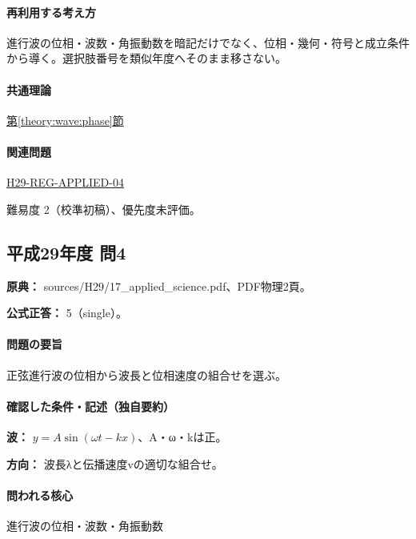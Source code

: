 \paragraph{再利用する考え方} 進行波の位相・波数・角振動数を暗記だけでなく、位相・幾何・符号と成立条件から導く。選択肢番号を類似年度へそのまま移さない。

\paragraph{共通理論} \hyperref[theory:wave:phase]{第\ref*{theory:wave:phase}節}

\paragraph{関連問題} \hyperref[q:h29-reg-applied-04]{H29-REG-APPLIED-04}

\par 難易度 2（校準初稿）、優先度未評価。

\subsection{平成29年度 問4}
\label{q:h29-reg-applied-04}

\noindent\textbf{原典：} sources/H29/17\_applied\_science.pdf、PDF物理2頁。

\textbf{公式正答：} 5（single）。

\paragraph{問題の要旨} 正弦進行波の位相から波長と位相速度の組合せを選ぶ。

\paragraph{確認した条件・記述（独自要約）}\mbox{}\par

\noindent\textbf{波：} \(y=A\sin(\omega t-kx)\)、A・ω・kは正。\par

\noindent\textbf{方向：} 波長λと伝播速度vの適切な組合せ。\par

\paragraph{問われる核心} 進行波の位相・波数・角振動数

